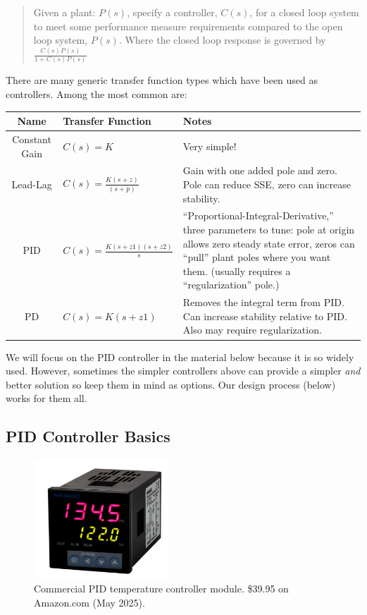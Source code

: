 \begin{quotation}   Given a plant: $P(s)$,  specify a controller, $C(s)$, for a closed loop system to meet  some performance measure requirements
compared to the open loop system, $P(s)$.
Where the closed loop response is governed by   $\frac{C(s)P(s)}{1 + C(s)P(s)}$
\end{quotation}

There are many generic transfer function types which have been used as controllers.  Among the
most common are:

\begin{tabular}{|c|l|p{3.5in}|}\hline
Name &  Transfer Function & Notes \\\hline
Constant Gain   & $C(s) = K$     & Very simple! \\\hline
Lead-Lag & $C(s) = \frac{K(s+z)}{(s+p)}$  & Gain with one added pole and zero. Pole can reduce SSE, zero can increase stability.\\\hline
PID &   $C(s) = \frac {K(s+z1)(s+z2)}  {s} $ & ``Proportional-Integral-Derivative,'' three parameters to tune: pole at origin allows zero steady state error, zeros can ``pull'' plant poles where you want them. (usually requires a ``regularization'' pole.)\\\hline
PD  &   $C(s) = K(s+z1)$  & Removes the integral term from PID.
Can increase stability relative to PID.  Also
may require regularization.\\\hline
\end{tabular}


We will focus on the PID controller in the material below because it is so
widely used.  However, sometimes the simpler controllers above can provide
a simpler {\it and} better solution so keep them in mind as options.
Our design process (below) works for them all.

\subsection{PID Controller Basics}

\begin{figure}\centering
\includegraphics[width=2.0in]{figs09/inkbirdPIDController.png}
\caption{Commercial PID temperature controller module.  \$39.95 on Amazon.com (May 2025).}\label{PIDControllerBox}
\end{figure}

